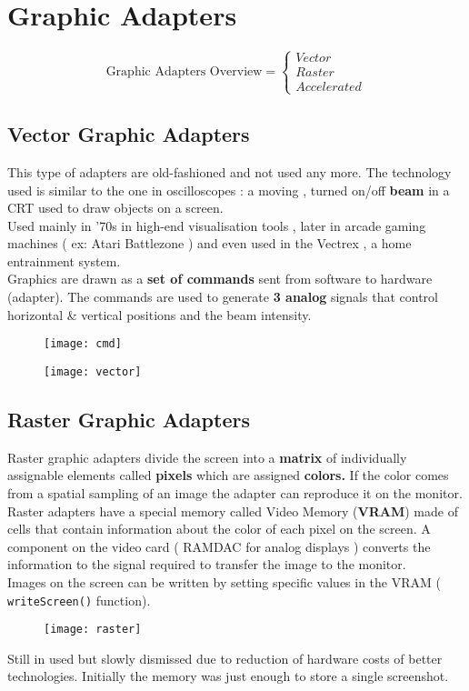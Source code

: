 \section{Graphic Adapters}
\[ \text{Graphic Adapters Overview} =
\begin{cases}
	Vector \\
	Raster \\
	Accelerated
\end{cases}
\]

\subsection{Vector Graphic Adapters}
This type of adapters are old-fashioned and not used any more. The technology used
is similar to the one in oscilloscopes : a moving , turned on/off \textbf{beam} in a CRT used to draw objects on a screen.\\
Used mainly in '70s in high-end visualisation tools , later in arcade gaming machines ( ex: Atari Battlezone ) and even used in the Vectrex , a home entrainment system.\\
Graphics are drawn as a \textbf{set of commands} sent from software to hardware (adapter). The commands are used to generate \textbf{3 analog} signals that control horizontal \& vertical positions and the beam intensity.
\begin{figure}[!h]
\begin{minipage}{.5\textwidth}
 \centering
  \texttt{[image: cmd]}
\end{minipage}%
	\begin{minipage}{.5\textwidth}
  \centering
  \texttt{[image: vector]}
\end{minipage}%
\end{figure}

\subsection{Raster Graphic Adapters}
Raster graphic adapters divide the screen into a \textbf{matrix} of individually assignable elements called \textbf{pixels} which are assigned \textbf{colors.} If the color comes from a spatial sampling of an image the adapter can reproduce it on the monitor.\\
Raster adapters have a special memory called Video Memory (\textbf{VRAM}) made of cells that contain information about the color of each pixel on the screen. A component on the video card ( RAMDAC for analog displays ) converts the information to the signal required to transfer the image to the monitor.\\
Images on the screen can be written by setting specific values in the VRAM ( \texttt{writeScreen()} function).
\begin{figure}[!h]
 \centering
  \texttt{[image: raster]}
\end{figure}
Still in used but slowly dismissed due to reduction of hardware costs of better technologies. Initially the memory was just enough to store a single screenshot.\\

